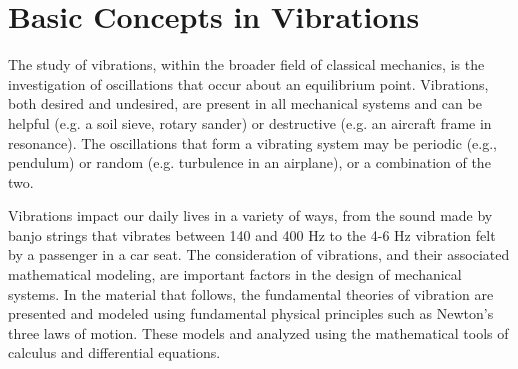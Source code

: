 \documentclass[12pt,letter]{article}
\begin{document}
	
	\setcounter{section}{0}	
	\setcounter{figure}{0}   
	\renewcommand\thefigure{\thesection.\arabic{figure}}
	\setcounter{equation}{0}   
	\renewcommand\theequation{\thesection.\arabic{equation}}

	\section{Basic Concepts in Vibrations}

    The study of vibrations, within the broader field of classical mechanics, is the investigation of oscillations that occur about an equilibrium point. Vibrations, both desired and undesired, are present in all mechanical systems and can be helpful (e.g. a soil sieve, rotary sander) or destructive (e.g. an aircraft frame in resonance). The oscillations that form a vibrating system may be periodic (e.g., pendulum) or random (e.g. turbulence in an airplane), or a combination of the two. 

    Vibrations impact our daily lives in a variety of ways, from the sound made by banjo strings that vibrates between 140 and 400 Hz to the 4-6 Hz vibration felt by a passenger in a car seat. The consideration of vibrations, and their associated mathematical modeling, are important factors in the design of mechanical systems. In the material that follows, the fundamental theories of vibration are presented and modeled using fundamental physical principles such as Newton's three laws of motion. These models and analyzed using the mathematical tools of calculus and differential equations. 
\end{document}
